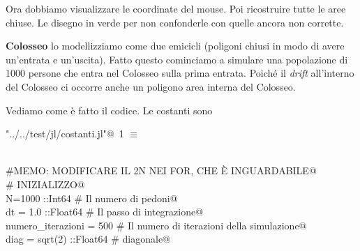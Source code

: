 \documentclass[]{article}
\begin{document}
Ora dobbiamo visualizzare le coordinate del mouse.
Poi ricostruire tutte le aree chiuse.
Le disegno in verde per non confonderle con quelle ancora non corrette.

{\bf Colosseo} lo modellizziamo come due emicicli (poligoni chiusi in modo di avere un'entrata e un'uscita).
Fatto questo cominciamo a simulare una popolazione di 1000 persone che entra nel Colosseo sulla prima entrata.
Poiché il {\sl drift} all'interno del Colosseo ci occorre anche un poligono area interna del Colosseo.

Vediamo come è fatto il codice.
Le costanti sono

\begin{flushleft} \small
\begin{minipage}{\linewidth} \label{scrap1}
\protect{}\verb@"../../test/jl/costanti.jl"@\nobreak\ {\footnotesize 1 }$\equiv$
\vspace{-1ex}
\begin{list}{}{} \item
\mbox{}\verb@@\\
\mbox{}\verb@\#MEMO: MODIFICARE IL 2N NEI FOR, CHE È INGUARDABILE@\\
\mbox{}\verb@\# INIZIALIZZO@\\
\mbox{}\verb@const N=1000 ::Int64                \# Il numero di pedoni@\\
\mbox{}\verb@const dt = 1.0 ::Float64               \# Il passo di integrazione@\\
\mbox{}\verb@const numero\_iterazioni = 500            \# Il numero di iterazioni della simulazione@\\
\mbox{}\verb@const diag = sqrt(2) ::Float64            \# diagonale@\\
\mbox{}\verb@@{\NWsep}
\end{list}
\vspace{-2ex}
\end{minipage}\\[4ex]
\end{flushleft}

%
\end{document}
